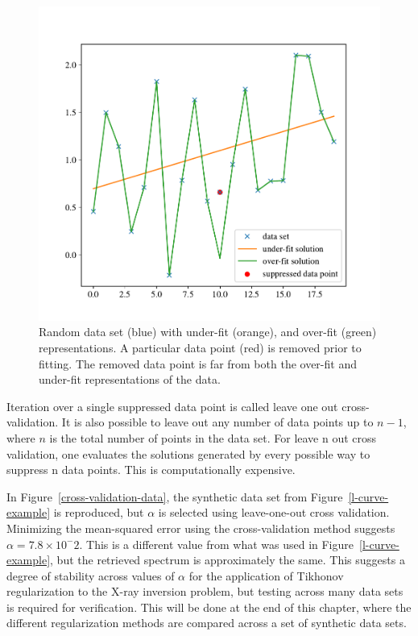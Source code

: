 \begin{figure}[p]
    \centering
    \includegraphics[width=1.0\textwidth]{figures/chapter_4/cross_validation_motivation/cross_validation_motivation.pdf}
    \caption{Random data set (blue) with under-fit (orange), and over-fit (green) representations. A particular data point (red) is removed prior to fitting. The removed data point is far from both the over-fit and under-fit representations of the data. }
    \label{cross_validation_motivation}
\end{figure}

Iteration over a single suppressed data point is called leave one out cross-validation. It is also possible to leave out any number of data points up to $n-1$, where $n$ is the total number of points in the data set. For leave n out cross validation, one evaluates the solutions generated by every possible way to suppress n data points. This is computationally expensive. 

In Figure~\ref{cross-validation-data}, the synthetic data set from Figure~\ref{l-curve-example} is reproduced, but $\alpha$ is selected using leave-one-out cross validation. Minimizing the mean-squared error using the cross-validation method suggests $\alpha=7.8\times10^-2.$ This is a different value from what was used in Figure~\ref{l-curve-example}, but the retrieved spectrum is approximately the same. This suggests a degree of stability across values of $\alpha$ for the application of Tikhonov regularization to the X-ray inversion problem, but testing across many data sets is required for verification. This will be done at the end of this chapter, where the different regularization methods are compared across a set of synthetic data sets. 

